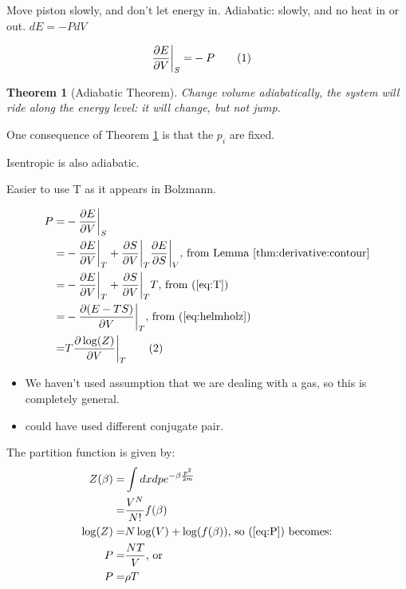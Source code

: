 \documentclass[]{article}
\newcommand\numberthis{\addtocounter{equation}{1}\tag{\theequation}}
\newtheorem{thm}{Theorem}
\begin{document}
Move piston slowly, and don't let energy in. Adiabatic: slowly, and no heat in or out. $dE = - P dV$

\begin{align*}
\frac{\partial E}{\partial V}\bigg|_S =& - P\numberthis \label{eq:defP}
\end{align*}


\begin{thm}[Adiabatic Theorem]\label{thm:adiabatic}
	Change volume adiabatically, the system will ride along the energy level: it will change, but not jump.
\end{thm}

One consequence of Theorem \ref{thm:adiabatic} is that the $p_i$ are fixed.

Isentropic is also adiabatic.

Easier to use T as it appears in Bolzmann.

\begin{align*}
P =& - \frac{\partial E}{\partial V}\bigg|_S \\
=& - \frac{\partial E}{\partial V}\bigg|_T + \frac{\partial S}{\partial V}\bigg|_T \frac{\partial E}{\partial S}\bigg|_V\text{, from Lemma \ref{thm:derivative:contour}}\\
=& - \frac{\partial E}{\partial V}\bigg|_T + \frac{\partial S}{\partial V}\bigg|_T T\text{, from (\ref{eq:T})}\\
=& - \frac{\partial(E-TS)}{\partial V}\bigg|_T \text{, from (\ref{eq:helmholz})}\\
=& T \frac{\partial \log(Z)}{\partial V}\bigg|_T \numberthis \label{eq:P_Z_V}
\end{align*}

\begin{itemize}
	\item We haven't used assumption that we are dealing with a gas, so this is completely general.
	\item could have used different conjugate pair.
\end{itemize}

The partition function is given by:
\begin{align*}
Z(\beta) =& \int dx dp e^{- \beta \frac{p^2}{2m}}\\
=& \frac{V^N}{N!} f(\beta)\\
\log(Z) =& N \log(V) + \log(f(\beta))\text{, so (\ref{eq:P})  becomes:}\\
P =& \frac{NT}{V}\text{, or}\\
P =& \rho T
\end{align*}
\end{document}
